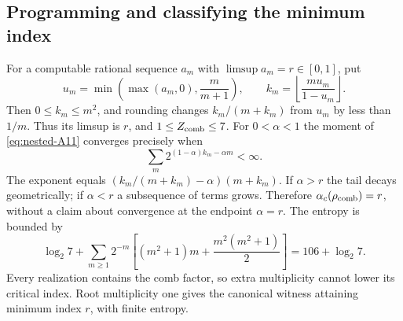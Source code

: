 \subsection{Programming and classifying the minimum index}
For a computable rational sequence $a_m$ with $\limsup a_m=r\in[0,1]$,
put
\[
 u_m=\min\!\left(\max(a_m,0),\frac{m}{m+1}\right),\qquad
 k_m=\left\lfloor\frac{mu_m}{1-u_m}\right\rfloor.
\]
Then $0\le k_m\le m^2$,
and rounding changes $k_m/(m+k_m)$ from $u_m$ by less than $1/m$.
Thus its limsup is $r$, and $1\le Z_{\rm comb}\le7$.
For $0<\alpha<1$ the moment of \eqref{eq:nested-A11} converges precisely when
\[
              \sum_m2^{(1-\alpha)k_m-\alpha m}<\infty.
\]
The exponent equals $(k_m/(m+k_m)-\alpha)(m+k_m)$.
If $\alpha>r$ the tail decays geometrically; if $\alpha<r$ a
subsequence of terms grows. Therefore $\alpha_c(\rho_{\rm comb})=r$,
without a claim about convergence at the endpoint $\alpha=r$.
The entropy is bounded by
\[
 \log_2 7+\sum_{m\ge1}2^{-m}
 \left[(m^2+1)m+\frac{m^2(m^2+1)}2\right]
                         =106+\log_2 7.
\]
Every realization contains the comb factor, so extra multiplicity
cannot lower its critical index. Root multiplicity one gives the
canonical witness attaining minimum index $r$, with finite entropy.

